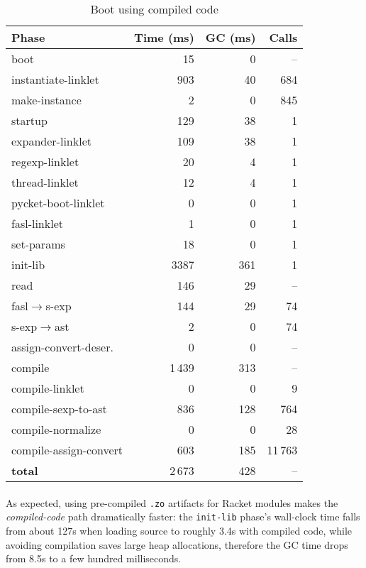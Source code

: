 		\begin{table}[ht]
		\centering
		\begin{tabular}{@{}lrrr@{}}
			\toprule
			Phase & Time (ms) & GC (ms) & Calls \\ \midrule
			boot                           &     15 &    0 & -- \\
			instantiate-linklet            &    903 &   40 & 684 \\
			make-instance                  &      2 &    0 & 845 \\
			startup                        &    129 &   38 & 1 \\
			\quad expander-linklet         &    109 &   38 & 1 \\
			\quad regexp-linklet                 &     20 &    4 & 1 \\
			\quad thread-linklet                 &     12 &    4 & 1 \\
			\quad pycket-boot-linklet            &      0 &    0 & 1 \\
			\quad fasl-linklet             &      1 &    0 & 1 \\
			\quad set-params               &     18 &    0 & 1 \\
			init-lib					   &	3387 &   361 & 1 \\ \midrule
			read                           &    146 &   29 & -- \\
			\quad fasl$\rightarrow$s-exp   &    144 &   29 & 74 \\
			\quad s-exp$\rightarrow$ast    &      2 &    0 & 74 \\
			\quad assign-convert-deser.    &      0 &    0 & -- \\ \midrule
			compile                        &  1\,439 &  313 & -- \\
			\quad compile-linklet          &      0 &    0 & 9 \\
			\quad compile-sexp-to-ast      &    836 &  128 & 764 \\
			\quad compile-normalize        &      0 &    0 & 28 \\
			\quad compile-assign-convert   &    603 &  185 & 11\,763 \\ \midrule
			\textbf{total}                 &  2\,673 &  428 & -- \\
			\bottomrule
		\end{tabular}
		\caption{Boot using compiled code}
		\label{tab:boot-compiled}
		\end{table}

		\paragraph{}%
			As expected, using pre-compiled \texttt{.zo} artifacts for Racket modules makes the \emph{compiled-code} path dramatically faster: the \texttt{init-lib} phase's wall-clock time falls from about 127s when loading source to roughly 3.4s with compiled code, while avoiding compilation saves large heap allocations, therefore the GC time drops from 8.5s to a few hundred milliseconds.

